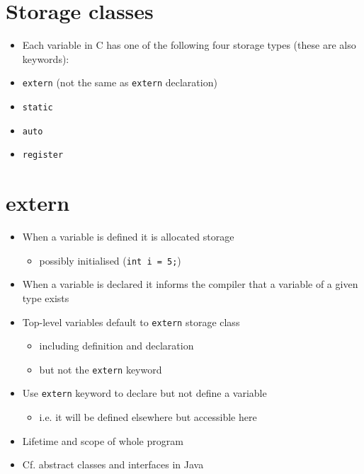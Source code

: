 \documentclass{article}
\begin{document}
\section{Storage classes}
\begin{itemize}
\item Each variable in C has one of the following four storage types (these are also keywords):

\item \verb!extern! (not the same as \verb!extern! declaration)
\item \verb!static!
\item \verb!auto!
\item \verb!register!
\end{itemize}



\section{extern}
\begin{itemize}
\item When a variable is defined it is allocated storage
\begin{itemize}
\item possibly initialised (\verb!int i = 5;!)
\end{itemize}
\item When a variable is declared it informs the compiler that a variable of a given type exists
\item Top-level variables default to \verb!extern! storage class
\begin{itemize}
\item including definition and declaration
\item but not the \verb!extern! keyword
\end{itemize}
\item Use \verb!extern! keyword to declare but not define a variable
\begin{itemize}
\item i.e. it will be defined elsewhere but accessible here
\end{itemize}
\item Lifetime and scope of whole program
\item Cf. abstract classes and interfaces in Java
\end{itemize}
\end{document}
